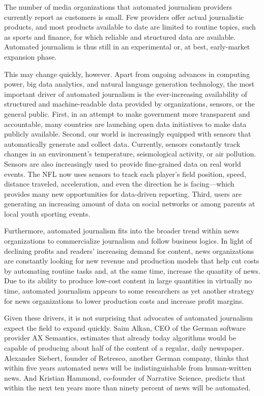 \documentclass[notoc, symmetric, nobib, nols]{towcenter-guideto-book}
\begin{document}
The number of media organizations that automated journalism providers currently report as customers is small. Few providers offer actual journalistic products, and most products available to date are limited to routine topics, such as sports and finance, for which reliable and structured data are available. Automated journalism is thus still in an experimental or, at best, early-market expansion phase.\autocite{doerr15}

This may change quickly, however. Apart from ongoing advances in computing power, big data analytics, and natural language generation technology, the most important driver of automated journalism is the ever-increasing availability of structured and machine-readable data provided by organizations, sensors, or the general public. First, in an attempt to make government more transparent and accountable, many countries are launching open data initiatives to make data publicly available. Second, our world is increasingly equipped with sensors that automatically generate and collect data. Currently, sensors constantly track changes in an environment's temperature, seismological activity, or air pollution. Sensors are also increasingly used to provide fine-grained data on real world events. The NFL now uses sensors to track each player's field position, speed, distance traveled, acceleration, and even the direction he is facing---which provides many new opportunities for data-driven reporting. Third, users are generating an increasing amount of data on social networks or among parents at local youth sporting events. 

Furthermore, automated journalism fits into the broader trend within news organizations to commercialize journalism and follow business logics. In light of declining profits and readers' increasing demand for content, news organizations are constantly looking for new revenue and production models that help cut costs by automating routine tasks and, at the same time, increase the quantity of news. Due to its ability to produce low-cost content in large quantities in virtually no time, automated journalism appears to some researchers as yet another strategy for news organizations to lower production costs and increase profit margins.\autocite{cohen15}

Given these drivers, it is not surprising that advocates of automated journalism expect the field to expand quickly. Saim Alkan, CEO of the German software provider AX Semantics, estimates that already today algorithms would be capable of producing about half of the content of a regular, daily newspaper. Alexander Siebert, founder of Retresco, another German company, thinks that within five years automated news will be indistinguishable from human-written news.\autocite{sie14} And Kristian Hammond, co-founder of Narrative Science, predicts that within the next ten years more than ninety percent of news will be automated.\autocite{levy12} 
\end{document}
